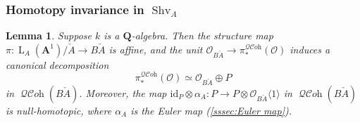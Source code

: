 \documentclass[12pt, oneside]{amsart}
\numberwithin{equation}{section}
\newtheorem{lemma}[subsubsection]{Lemma}
\theoremstyle{remark}
\theoremstyle{plain}
\DeclareMathOperator{\QCOH}{\mathcal{QC}\textit{oh}}
\newcommand{\Loop}{\operatorname{L}}
\newcommand{\OO}{\mathcal{O}}
\newcommand{\id}{\mathrm{id}}
\newcommand{\aff}{\mathbf{A}^1}
\newcommand{\Thom}[1]{\langle #1 \rangle}
\newcommand{\Shv}{\operatorname{Shv}}
\begin{document}
\subsubsection{Homotopy invariance in $\Shv_A$}

\begin{lemma}\label{lem:a1 weight splitting}
Suppose $k$ is a $\mathbf{Q}$-algebra.
Then the structure map $\pi : \Loop_A(\aff)/\check{A} \to B\check{A}$ is affine, and the unit $\OO_{B\check{A}} \to \pi^{\QCOH}_*(\OO)$ induces a canonical decomposition
\[
  \pi^{\QCOH}_*(\OO) \simeq \OO_{B\check{A}} \oplus P
\]
in $\QCOH(B\check{A})$.
Moreover, the map $\id_{P} \otimes \alpha_A : P \to P \otimes \OO_{B\check{A}}\Thom{1}$ in $\QCOH(B\check{A})$ is null-homotopic, where $\alpha_A$ is the Euler map (\ref{sssec:Euler map}).
\end{lemma}
\end{document}
